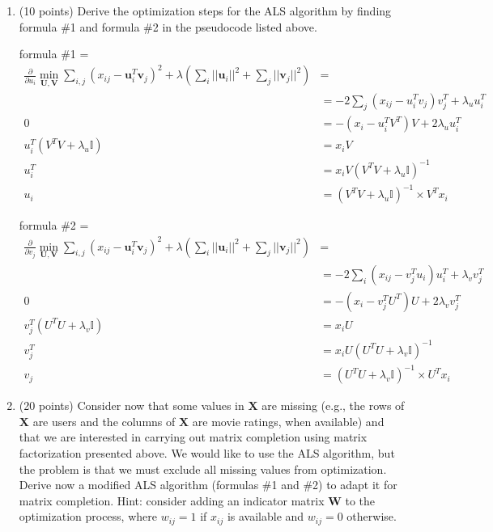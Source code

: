 \documentclass[twoside]{article}
\begin{document}
\begin{enumerate}
\item (10 points) Derive the optimization steps for the ALS algorithm by finding formula \#1 and formula \#2 in the  pseudocode listed above. 

formula \#1 = 
\begin{equation*}
\begin{split}
\frac{\partial}{\partial u_i}\underset{\mathbf{U},\mathbf{V}}{\min}\sum_{i,j}(x_{ij}-\mathbf{u}_{i}^{T}\mathbf{v}_{j})^{2}+\lambda(\sum_{i}||\mathbf{u}_{i}||^{2}+\sum_{j}||\mathbf{v}_{j}||^{2}) & = \\
& = -2\sum_j\left(x_{ij} - u^T_i v_j\right)v^T_j +  \lambda_u u_i^T \\
0 & = -\left(x_{i} - u^T_iV^T\right)V + 2 \lambda_u u_i^T \\
u_i^T(V^T V + \lambda_u \mathbb{I}) & = x_iV \\
u_i^T  & = x_iV(V^TV + \lambda_u \mathbb{I})^{-1} \\
u_i &= (V^TV + \lambda_u \mathbb{I})^{-1} \times V^Tx_i
\end{split} 
\end{equation*}


formula  \#2 =
\begin{equation*}
\begin{split}
\frac{\partial}{\partial v_j}\underset{\mathbf{U},\mathbf{V}}{\min}\sum_{i,j}(x_{ij}-\mathbf{u}_{i}^{T}\mathbf{v}_{j})^{2}+\lambda(\sum_{i}||\mathbf{u}_{i}||^{2}+\sum_{j}||\mathbf{v}_{j}||^{2}) & = \\
& = -2\sum_i\left(x_{ij} - v^T_j u_i\right)u^T_i + \lambda_v v_j^T \\
0 & = -\left(x_{i} - v^T_jU^T\right)U + 2 \lambda_vv_j^T \\
v_j^T(U^T U + \lambda_v \mathbb{I}) & = x_iU \\
v_j^T  & = x_iU(U^TU + \lambda_v \mathbb{I})^{-1} \\
v_j & = (U^TU+ \lambda_v \mathbb{I})^{-1} \times U^Tx_i
\end{split} 
\end{equation*}
\item (20 points) Consider now that some values in $\mathbf{X}$ are missing (e.g., the rows of $\mathbf{X}$ are users and the columns of $\mathbf{X}$ are movie ratings, when available) and that we are interested in carrying out matrix completion using matrix factorization presented above. We would like to use the ALS algorithm, but the problem is that we must exclude all missing values from optimization. Derive now a modified ALS algorithm (formulas \#1 and \#2) to adapt it for matrix completion. Hint: consider adding an indicator matrix $\mathbf{W}$ to the optimization process, where $w_{ij}=1$ if $x_{ij}$ is available and $w_{ij}=0$ otherwise.


\end{enumerate}
\end{document}
